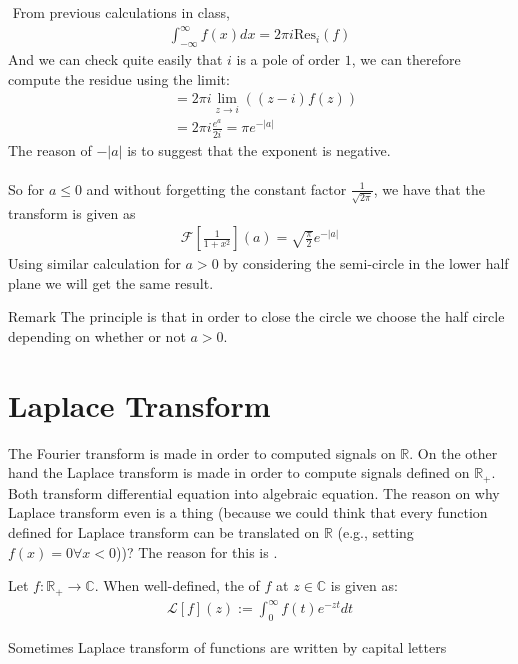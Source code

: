 \begin{parag}{ $ $}
    From previous calculations in class, 
	\begin{align*} 
		\int_{-\infty}^{\infty} f\left(x\right) dx =  2\pi i \text{Res}_i \left(f\right)
	\end{align*}
	And we can check quite easily that $i$ is a pole of order $1$, we can therefore compute the residue using the limit:
	\begin{align*} 
		&= 2\pi i \lim_{z \to i} \left(\left(z - i\right)f\left(z\right)\right)\\
		&= 2\pi i \frac{e^{a}}{2i} = \pi e^{-\left|a\right|}
	\end{align*}
	The reason of $-\left|a\right|$ is to suggest that the exponent is negative.\\
	$ $\\
	So for $a \leq 0$ and without forgetting the constant factor $\frac{1}{\sqrt{2\pi}}$, we have that the transform is given as
	\begin{align*} 
		\mathcal{F}\left[\frac{1}{1 + x^2}\right] \left(a\right) = \sqrt{\frac{\pi}{2}}e^{-\left|a\right|}
	\end{align*}
	Using similar calculation for $a > 0$ by considering the semi-circle in the lower half plane we will get the same result.

	\begin{subparag}{Remark}
	    The principle is that in order to close the circle we choose the half circle depending on whether or not $a > 0$.
	\end{subparag}
\end{parag}



\chapter{Laplace Transform}
The Fourier transform is made in order to computed signals on $ \mathbb{R}$. On the other hand the Laplace transform is made in order to compute signals defined on $ \mathbb{R}_{+}$. Both transform differential equation into algebraic equation. The reason on why Laplace transform even is a thing (because we could think that every function defined for Laplace transform can be translated on $ \mathbb{R}$ (e.g., setting $f\left(x\right) = 0 \forall x < 0$))? The reason for this is .

\begin{definition}
 	Let $f: \mathbb{R}_+ \to \mathbb{C}$. When well-defined, the  of $f$ at $z \in \mathbb{C}$ is given as:
	\begin{align*} 
		\mathcal{L}\left[f\right] \left(z\right) := \int_{0}^{\infty}f\left(t\right)e^{-zt}dt
	\end{align*}
\end{definition}
Sometimes Laplace transform of functions are written by capital letters



